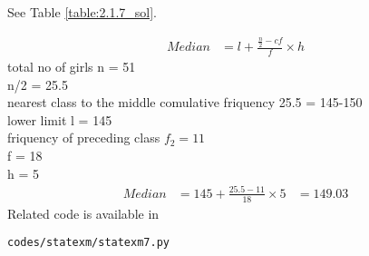 See Table \ref{table:2.1.7_sol}.
\begin{table}[!ht]
	\centering
	
	\caption{}
\label{table:2.1.7_sol}
\end{table}
\begin{align}
Median &= l + \frac{\frac{n}{2} - cf}{f}\times h
\end{align}
total no of girls n = 51
\\
n/2 = 25.5
\\
nearest class to the middle comulative friquency 25.5 = 145-150
\\
lower limit l = 145
\\
friquency of preceding class $f_2 = 11$
\\
f = 18
\\
h = 5
\begin{align}
Median &= 145 + \frac{25.5 - 11}{18}\times 5
&= 149.03
\end{align}
Related code is available in 
\begin{lstlisting}
codes/statexm/statexm7.py
\end{lstlisting}

